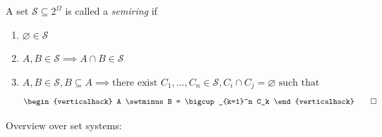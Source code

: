 \begin{definition}[Semiring]\label{def:semiring}
A set $\mathcal{S} \subseteq 2^\Omega$ is called a \emph{semiring} if
\begin{enumerate}[label=(\roman*)]
\item 
\label{def:semiring-emptyset}
$\varnothing \in \mathcal{S}$ 
\item 
\label{def:semiring-closure-intersection}
$A,B \in \mathcal{S} \implies A \cap B \in \mathcal{S}$ 
\item 
\label{def:semiring-subset-difference-disjoint-union}
$A,B \in \mathcal{S}, B \subseteq A \implies \text{there exist } C_1,\dots,C_n \in \mathcal{S}, C_i \cap C_j = \varnothing \text{ such that}$
\[
\begin{verticalhack}
A \setminus B = \bigcup_{k=1}^n C_k
\end{verticalhack}
\qedhere
\]
\end{enumerate}
\end{definition}


Overview over set systems:
\begingroup
\tiny
\setlength{\tabcolsep}{1pt}
\def\colfracsize{0.24}
\renewcommand{\arraystretch}{1.4}

